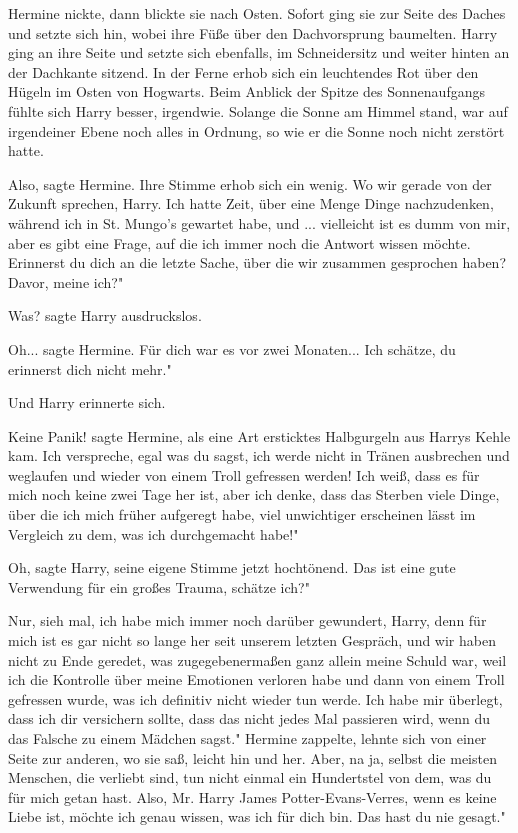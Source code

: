 Hermine nickte, dann blickte sie nach Osten. Sofort ging sie zur Seite des
Daches und setzte sich hin, wobei ihre Füße über den Dachvorsprung baumelten.
Harry ging an ihre Seite und setzte sich ebenfalls, im Schneidersitz und weiter
hinten an der Dachkante sitzend. In der Ferne erhob sich ein leuchtendes Rot
über den Hügeln im Osten von Hogwarts. Beim Anblick der Spitze des
Sonnenaufgangs fühlte sich Harry besser, irgendwie. Solange die Sonne am Himmel
stand, war auf irgendeiner Ebene noch alles in Ordnung, so wie er die Sonne noch
nicht zerstört hatte.

\glqq Also\grqq{}, sagte Hermine. Ihre Stimme erhob sich ein wenig. \glqq Wo wir
gerade von der Zukunft sprechen, Harry. Ich hatte Zeit, über eine Menge Dinge
nachzudenken, während ich in St. Mungo's gewartet habe, und ... vielleicht ist
es dumm von mir, aber es gibt eine Frage, auf die ich immer noch die Antwort
wissen möchte. Erinnerst du dich an die letzte Sache, über die wir zusammen
gesprochen haben? Davor, meine ich?"

\glqq Was?\grqq{} sagte Harry ausdruckslos.

\glqq Oh...\grqq{} sagte Hermine. \glqq Für dich war es vor zwei Monaten... Ich
schätze, du erinnerst dich nicht mehr."

Und Harry erinnerte sich.

\glqq Keine Panik!\grqq{} sagte Hermine, als eine Art ersticktes Halbgurgeln aus
Harrys Kehle kam. \glqq Ich verspreche, egal was du sagst, ich werde nicht in
Tränen ausbrechen und weglaufen und wieder von einem Troll gefressen werden! Ich
weiß, dass es für mich noch keine zwei Tage her ist, aber ich denke, dass das
Sterben viele Dinge, über die ich mich früher aufgeregt habe, viel unwichtiger
erscheinen lässt im Vergleich zu dem, was ich durchgemacht habe!"

\glqq Oh\grqq{}, sagte Harry, seine eigene Stimme jetzt hochtönend. \glqq Das
ist eine gute Verwendung für ein großes Trauma, schätze ich?"

\glqq Nur, sieh mal, ich habe mich immer noch darüber gewundert, Harry, denn für
mich ist es gar nicht so lange her seit unserem letzten Gespräch, und wir haben
nicht zu Ende geredet, was zugegebenermaßen ganz allein meine Schuld war, weil
ich die Kontrolle über meine Emotionen verloren habe und dann von einem Troll
gefressen wurde, was ich definitiv nicht wieder tun werde. Ich habe mir
überlegt, dass ich dir versichern sollte, dass das nicht jedes Mal passieren
wird, wenn du das Falsche zu einem Mädchen sagst." Hermine zappelte, lehnte sich
von einer Seite zur anderen, wo sie saß, leicht hin und her. \glqq Aber, na ja,
selbst die meisten Menschen, die verliebt sind, tun nicht einmal ein Hundertstel
von dem, was du für mich getan hast. Also, Mr. Harry James Potter-Evans-Verres,
wenn es keine Liebe ist, möchte ich genau wissen, was ich für dich bin. Das hast
du nie gesagt."

